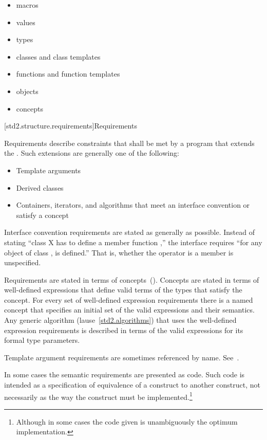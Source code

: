 \begin{itemize}
\item macros
\item values
\item types
\item classes and class templates
\item functions and function templates
\item objects
\item concepts
\end{itemize}

[std2.structure.requirements]{Requirements}

\pnum
{}%
Requirements describe constraints that shall be met by a \Cpp program that
extends the .
Such extensions are generally one of the following:

\begin{itemize}
\item Template arguments
\item Derived classes
\item Containers, iterators, and algorithms that meet an interface convention
or satisfy a concept
\end{itemize}

\pnum
Interface convention requirements are stated as generally as possible. Instead
of stating ``class X has to define a member function ,'' the
interface requires ``for any object  of class ,  is
defined.'' That is, whether the operator is a member is unspecified.

\pnum
Requirements are stated in terms of concepts~().
Concepts are stated in terms of well-defined expressions that define valid terms of
the types that satisfy the concept. For every set of
well-defined expression requirements there is a named concept that
specifies an initial set of the valid expressions and their semantics. Any generic
algorithm (lause~\ref{std2.algorithms}) that uses the well-defined expression requirements
is described in terms of the valid expressions for its formal type parameters.

\pnum
Template argument requirements are sometimes referenced by name.
See~.

\pnum
In some cases the semantic requirements are presented as \Cpp code.
Such code is intended as a
specification of equivalence of a construct to another construct, not
necessarily as the way the construct
must be implemented.\footnote{Although in some cases the code given is
unambiguously the optimum implementation.}

